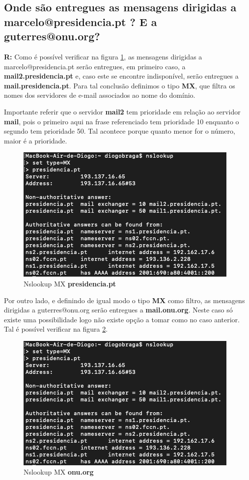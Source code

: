 \documentclass{llncs}
\begin{document}
\subsection{\textbf{Onde são entregues as mensagens dirigidas a marcelo@presidencia.pt ? E a guterres@onu.org?}}
\textbf{R:} Como é possível verificar na figura \ref{fig:71}, as mensagens dirigidas a marcelo@presidencia.pt serão entregues, em primeiro caso, a \textbf{mail2.presidencia.pt} e, caso este se encontre indisponível, serão entregues a \textbf{mail.presidencia.pt}. Para tal conclusão definimos o tipo \textbf{MX}, que filtra os nomes dos servidores de e-mail associados ao nome do domínio.

Importante referir que o servidor \textbf{mail2} tem prioridade em relação ao servidor \textbf{mail}, pois o primeiro aqui na frase referenciado tem prioridade 10 enquanto o segundo tem prioridade 50. Tal acontece porque quanto menor for o número, maior é a prioridade.

\begin{figure}[H]
\begin{center}
\includegraphics[scale=0.6]{7_1.png}
\end{center}
\caption{\label{fig:71}Nslookup MX \textbf{presidencia.pt}}
\end{figure}

Por outro lado, e definindo de igual modo o tipo \textbf{MX} como filtro, as mensagens dirigidas a guterres@onu.org serão entregues a \textbf{mail.onu.org}. Neste caso só existe uma possibilidade logo não existe opção a tomar como no caso anterior. Tal é possível verificar na figura \ref{fig:72}.

\begin{figure}[H]
\begin{center}
\includegraphics[scale=0.6]{7_1.png}
\end{center}
\caption{\label{fig:72}Nslookup MX \textbf{onu.org}}
\end{figure}
\end{document}

